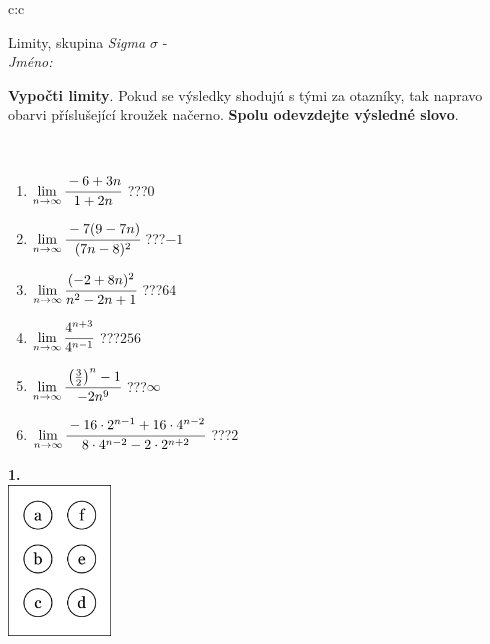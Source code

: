 \documentclass[10pt]{report}
\begin{document}
\begin{tabular}{c:c}
\begin{minipage}[c][104.5mm][t]{0.5\linewidth}
\begin{center}
\vspace{7mm}
{\huge Limity, skupina \textit{Sigma $\sigma$} -}\\[5mm]
\textit{Jméno:}\phantom{xxxxxxxxxxxxxxxxxxxxxxxxxxxxxxxxxxxxxxxxxxxxxxxxxxxxxxxxxxxxxxxxx}\\[5mm]
\begin{minipage}{0.95\linewidth}
\begin{center}
\textbf{Vypočti limity}. Pokud se výsledky shodujú s tými za otazníky, tak napravo\\obarvi příslušející kroužek načerno. \textbf{Spolu odevzdejte výsledné slovo}.
\end{center}
\end{minipage}
\\[1mm]
\begin{minipage}{0.79\linewidth}
\begin{center}
\begin{varwidth}{\linewidth}
\begin{enumerate}
\normalsize
\item $\lim\limits_{n\to\infty}\cfrac{-6+3n}{1+2n}$\quad \dotfill\; ???\;\dotfill \quad $0$
\item $\lim\limits_{n\to\infty}\cfrac{-7(9-7n)}{(7n-8)^2}$\quad \dotfill\; ???\;\dotfill \quad $-1$
\item $\lim\limits_{n\to\infty}\cfrac{(-2+8n)^2}{n^2-2n+1}$\quad \dotfill\; ???\;\dotfill \quad $64$
\item $\lim\limits_{n\to\infty}\cfrac{4^{n+3}}{4^{n-1}}$\quad \dotfill\; ???\;\dotfill \quad $256$
\item $\lim\limits_{n\to\infty}\cfrac{\left(\frac{3}{2}\right)^n -1}{-2n^{9}}$\quad \dotfill\; ???\;\dotfill \quad $\infty$
\item $\lim\limits_{n\to\infty}\cfrac{-16\cdot 2^{n-1}+16\cdot 4^{n-2}}{8\cdot 4^{n-2}-2\cdot 2^{n+2}}$\quad \dotfill\; ???\;\dotfill \quad $2$
\end{enumerate}
\end{varwidth}
\end{center}
\end{minipage}
\begin{minipage}{0.20\linewidth}
\begin{center}
{\Huge\bfseries 1.} \\[2mm]
\includegraphics[height=40mm]{../images/braille.png}

\end{center}
\end{minipage}
\end{center}
\end{minipage}
\end{tabular}
\end{document}
